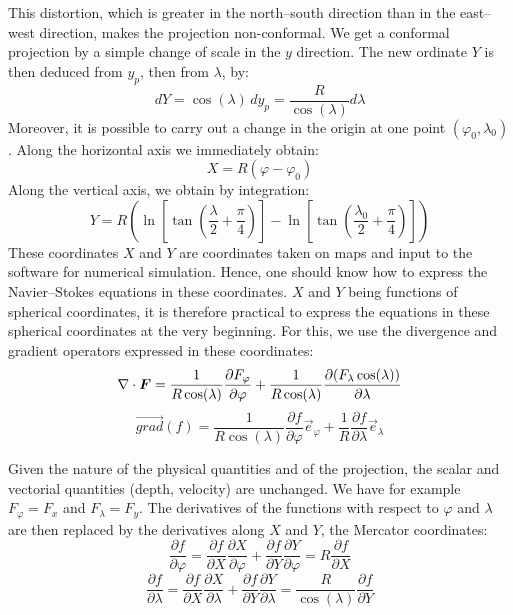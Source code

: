 This distortion, which is greater in the north--south direction than in the
east--west direction, makes the projection non-conformal. We get a conformal
projection by a simple change of scale in the $y$ direction. The new ordinate
$Y$ is then deduced from $y_{p}$, then from $\lambda$, by:%
\begin{equation}
  dY=\cos(\lambda)\,dy_{p}=\dfrac{R}{\cos(\lambda)}d\lambda
\end{equation}
Moreover, it is possible to carry out a change in the origin at one point
$(\varphi_{0},\lambda_{0})$. Along the horizontal axis we immediately obtain:%
\begin{equation}
  X=R(\varphi-\varphi_{0})
\end{equation}
Along the vertical axis, we obtain by integration:%
\begin{equation}
  Y=R\left(  \ln\left[  \tan\left(  \dfrac{\lambda}{2}+\dfrac{\pi}{4}\right)
    \right]  -\ln\left[  \tan\left(  \dfrac{\lambda_{0}}{2}+\dfrac{\pi}{4}\right)
    \right]  \right)
\end{equation}
These coordinates $X$ and $Y$ are coordinates taken on maps and input to the
software for numerical simulation. Hence, one should know how to express the
Navier--Stokes equations in these coordinates. $X$ and $Y$ being functions of
spherical coordinates, it is therefore practical to express the equations in
these spherical coordinates at the very beginning. For this, we use the
divergence and gradient operators expressed in these coordinates:%
\begin{equation}
  \Div \vec{F}=\dfrac{1}{R\cos(\lambda)}\dfrac{\partial F_{\varphi}}%
  {\partial\varphi}+\dfrac{1}{R\cos(\lambda)}\dfrac{\partial(F_{\lambda}%
    \cos(\lambda))}{\partial\lambda}%
\end{equation}
%
\begin{equation}
  \vec{grad}(f)=\dfrac{1}{R\cos(\lambda)}\dfrac{\partial f}%
  {\partial\varphi}\vec{e}_{\varphi}+\dfrac{1}{R}\dfrac{\partial f}{\partial
    \lambda}\vec{e}_{\lambda}%
\end{equation}

Given the nature of the physical quantities and of the projection, the scalar
and vectorial quantities (depth, velocity) are unchanged. We have for example
$F_{\varphi}=F_{x}$ and $F_{\lambda}=F_{y}$.
The derivatives of the functions with respect to $\varphi$ and $\lambda$ are
then replaced by the derivatives along $X$ and $Y$, the Mercator coordinates:%
\begin{equation}
  \dfrac{\partial f}{\partial\varphi}=\dfrac{\partial f}{\partial X}\dfrac{\partial
    X}{\partial\varphi}+\dfrac{\partial f}{\partial Y}\dfrac{\partial Y}%
  {\partial\varphi}=R\dfrac{\partial f}{\partial X}%
\end{equation}
%
\begin{equation}
  \dfrac{\partial f}{\partial\lambda}=\dfrac{\partial f}{\partial X}\dfrac{\partial
    X}{\partial\lambda}+\dfrac{\partial f}{\partial Y}\dfrac{\partial Y}%
  {\partial\lambda}=\dfrac{R}{\cos(\lambda)}\dfrac{\partial f}{\partial Y}%
\end{equation}

